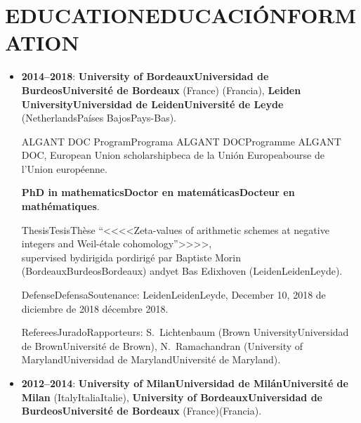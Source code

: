 \documentclass{article}
\newcommand{\biling}[3]{\ifdefined\english#1\fi\ifdefined\spanish#2\fi\ifdefined\french#3\fi}
\begin{document}
\vspace{1em}

{\color{RoyalBlue}\section*{\biling{EDUCATION}{EDUCACIÓN}{FORMATION}}}

\begin{itemize}
\item \textbf{2014--2018}: \textbf{\biling{University of Bordeaux}{Universidad de Burdeos}{Université de Bordeaux}}\biling{ (France)}{ (Francia)}{},
  \textbf{\biling{Leiden University}{Universidad de Leiden}{Université de Leyde}} (\biling{Netherlands}{Países Bajos}{Pays-Bas}).

  \biling{ALGANT DOC Program}{Programa ALGANT DOC}{Programme ALGANT DOC}, \biling{European Union scholarship}{beca de la Unión Europea}{bourse de l'Union européenne}.

  \textbf{\biling{PhD in mathematics}{Doctor en matemáticas}{Docteur en mathématiques}}.

  \biling{Thesis}{Tesis}{Thèse} \biling{``}{<<}{<<}Zeta-values of arithmetic schemes at negative integers and Weil-étale cohomology\biling{''}{>>}{>>},\\
  \biling{supervised by}{dirigida por}{dirigé par} Baptiste Morin (\biling{Bordeaux}{Burdeos}{Bordeaux}) \biling{and}{y}{et} Bas Edixhoven (\biling{Leiden}{Leiden}{Leyde}).

  \biling{Defense}{Defensa}{Soutenance}: \biling{Leiden}{Leiden}{Leyde}, \biling{December 10, 2018}{10 de diciembre de 2018}{10 décembre 2018}.

  \biling{Referees}{Jurado}{Rapporteurs}:
  S.~Lichtenbaum (\biling{Brown University}{Universidad de Brown}{Université de Brown}),
  N.~Ramachandran (\biling{University of Maryland}{Universidad de Maryland}{Université de Maryland}).

\iffalse
  \biling{Examining committee}{Jurado}:
  P.~Cassou-Noguès (Université de Bordeaux),
  Ph.~Cassou-Noguès (Université de Bordeaux),
  D.~Holmes (Universiteit Leiden)
  R.~de Jeu (Vrije Universiteit Amsterdam),
  W.~van der Kallen (Universiteit Utrecht),
  H.~Lenstra (Universiteit Leiden),
  P.~Stevenhagen (Universiteit Leiden).
\fi

\item \textbf{2012--2014}: \textbf{\biling{University of Milan}{Universidad de Milán}{Université de Milan}} (\biling{Italy}{Italia}{Italie}),
  \textbf{\biling{University of Bordeaux}{Universidad de Burdeos}{Université de Bordeaux}}\biling{ (France)}{(Francia)}{}.


\end{itemize}
\end{document}
